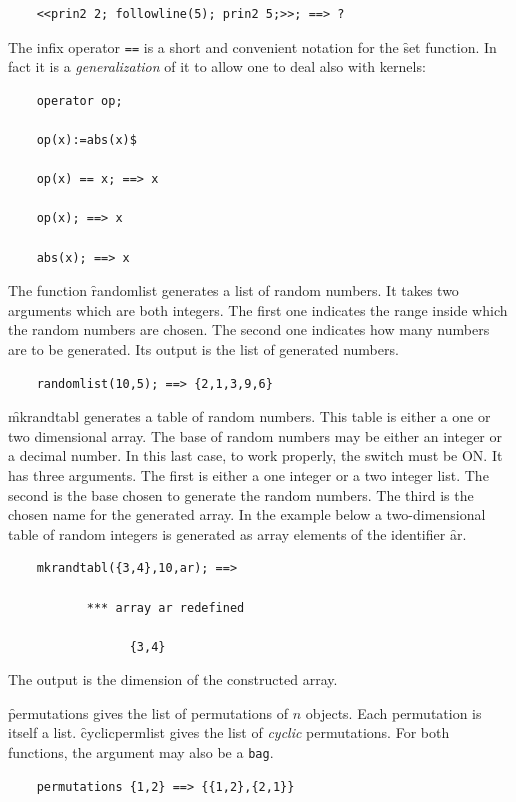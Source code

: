 \begin{itemize}
\begin{verbatim}
    <<prin2 2; followline(5); prin2 5;>>; ==> ?
\end{verbatim}
\hypertarget{reserved:setvalueop}{}
The infix operator \texttt{==} is a short and convenient notation for the \f{set}
function. In fact it is a \emph{generalization} of it to allow one to
deal also with kernels:
\begin{verbatim}
    operator op;

    op(x):=abs(x)$

    op(x) == x; ==> x

    op(x); ==> x

    abs(x); ==> x
\end{verbatim}
\hypertarget{operator:RANDOMLIST}{}
The function \f{randomlist} generates a list of random numbers. It takes
two arguments which are both integers. The first one indicates the range
inside which the random numbers are chosen. The second one indicates how
many numbers are to be generated. Its output is the list of
generated numbers.
\begin{verbatim}
    randomlist(10,5); ==> {2,1,3,9,6}
\end{verbatim}
\hypertarget{operator:MKRANDTABL}{}
\f{mkrandtabl} generates a table of random numbers. This table is either
a one or two dimensional array. The base of random numbers may be either
an integer or a decimal number. In this last case, to work properly,
the switch  must be ON. It has three arguments. The first is
either a one integer or a two integer list. The second is the base chosen
to generate the random numbers. The third is the chosen name for the
generated array. In the example below a two-dimensional table of
random integers is generated as array elements of the identifier {\f ar}.
\begin{verbatim}
    mkrandtabl({3,4},10,ar); ==>

           *** array ar redefined

                 {3,4}
\end{verbatim}
The output is the dimension of the constructed array.

\hypertarget{operator:PERMUTATIONS}{}
\hypertarget{operator:CYCLICPERMLIST}{}
\f{permutations} gives the list of permutations of $n$ objects.
Each permutation is itself a list. \f{cyclicpermlist} gives the list of
\emph{cyclic} permutations. For both functions, the argument may
also be a {\tt bag}.
\begin{verbatim}
    permutations {1,2} ==> {{1,2},{2,1}}


\end{verbatim}
\end{itemize}
